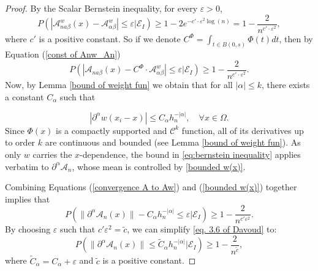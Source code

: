 \documentclass{article}
\begin{document}
\begin{proof}
By the Scalar Bernstein inequality, for every $\varepsilon>0$,
\begin{equation}
    P\left(\left|\mathscr{A}_{n a \beta}^w(x)-\mathscr{A}^w_{\alpha \beta}\right| \leq \varepsilon \Big|  \mathscr{E}_I\right)\geq 1-2 e^{-c'\cdot \varepsilon^2 \log(n) }=1-\frac{2}{n^{c'\cdot \varepsilon^2 }},
    \label{eq:bernstein inequality}
\end{equation}
where $c'$ is a positive constant. So if we denote $C^{\Phi}=\int_{t\in B(0, s)}\Phi(t) dt$, then by Equation (\ref{const of Anw_An})
\begin{equation}
  P\left(\left|\mathscr{A}_{n a \beta}(x)-C^{\Phi}\cdot\mathscr{A}^w_{\alpha \beta}\right| \leq \varepsilon \Big| \mathscr{E}_I\right)\geq 1-\frac{2}{n^{c'\cdot \varepsilon^2 }}.
    \label{convergence A to Aw}
\end{equation}
Now, by Lemma \ref{bound of weight fun} we obtain that for all $|\alpha| \leq k$, there exists a constant  $C_\alpha$ such that 

\begin{equation}
    \left|\partial^\alpha w(x_i-x)\right| \leq C_\alpha h_n^{-|\alpha|}, \quad \forall x \in \Omega.
    \label{bounded w(x)}
\end{equation}
Since $\Phi(x)$ is a compactly supported and $\mathcal{C}^k$ function, all of its derivatives up to order $k$ are continuous and bounded (see Lemma \ref{bound of weight fun}).
As only $w$ carries the $x$-dependence, the bound in \eqref{eq:bernstein inequality} applies verbatim to $\partial^\alpha \mathscr{A}_n$, whose mean is controlled by \eqref{bounded w(x)}.

Combining Equations (\ref{convergence A to Aw}) and (\ref{bounded w(x)}) together implies that 
\begin{equation}
     P(\|\partial^{\alpha} \mathscr{A}_n({x})\| - C_\alpha h_n^{-|\alpha|}\leq \varepsilon \Big|\mathscr{E} _I)\geq 1-\frac{2}{n^{c' \varepsilon^2 }}.
    \label{eq. 3.6 of Davoud}
\end{equation}
By choosing $\varepsilon$ such that
$c'\varepsilon^2=\tilde{c}$,  
we can simplify \eqref{eq. 3.6 of Davoud} to: 
\begin{equation} P\left(\|\partial^{\alpha} \mathscr{A}_n({x})\| \leq \tilde{C}_\alpha h_n^{-|\alpha|}\Big|\mathscr{E}_I\right) \geq 1 - \frac{2}{n^{\tilde{c}}}, 
\end{equation}
where $\tilde{C}_\alpha = C_\alpha + \varepsilon$ and $\tilde{c}$ is a positive constant.
\end{proof} 
\end{document}
